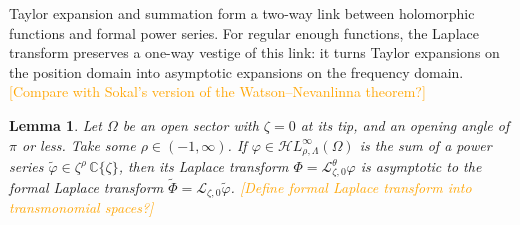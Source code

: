 \documentclass{article}
\newcommand{\singexp}[2]{\mathcal{H}L^\infty_{#1, #2}}
\newcommand{\C}{\mathbb{C}}
\newcommand{\series}[1]{\tilde{#1}}
\newcommand{\laplace}{\mathcal{L}}
\theoremstyle{definition}
\theoremstyle{plain}
\newtheorem{lemma}[definition]{Lemma}
\begin{document}
Taylor expansion and summation form a two-way link between holomorphic functions and formal power series. For regular enough functions, the Laplace transform preserves a one-way vestige of this link: it turns Taylor expansions on the position domain into asymptotic expansions on the frequency domain. \textcolor{orange}{[Compare with Sokal's version of the Watson--Nevanlinna theorem?]}
\begin{lemma}\label{lem:laplace-bridge}
Let $\Omega$ be an open sector with $\zeta = 0$ at its tip, and an opening angle of $\pi$ or less. Take some $\rho \in (-1,\infty)$. If $\varphi \in \singexp{\rho}{\Lambda}(\Omega)$ is the sum of a power series $\series{\varphi} \in \zeta^\rho\,\C\{\zeta\}$, then its Laplace transform $\Phi = \laplace_{\zeta, 0}^\theta \varphi$ is asymptotic to the formal Laplace transform $\series{\Phi} = \laplace_{\zeta, 0} \series{\varphi}$. \textcolor{orange}{[Define formal Laplace transform into transmonomial spaces?]}
\end{lemma}
\end{document}
